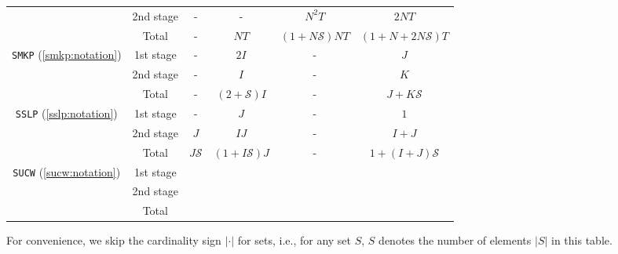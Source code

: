 \begin{table}[H]
{\begin{threeparttable}
\begin{tabular}{@{}cccccc@{}}
				& 2nd stage & -              & -                                  & $N^2 T$              & $2NT$                     \\ \cmidrule(l){2-6} 
				& Total          & -              & $NT$                               & $(1+N\mathcal{S})NT$ & $(1+N+2N\mathcal{S})T$    \\ \midrule
				\multirow{3}{*}{\texttt{SMKP} (\ref{smkp:notation})}   & 1st stage & -              & $2I$                               & -                    & $J$                       \\
				& 2nd stage & -              & $I$                                & -                    & $K$                       \\ \cmidrule(l){2-6} 
				& Total          & -              & $(2+\mathcal{S})I$                 & -                    & $J+K\mathcal{S}$          \\ \midrule
				\multirow{3}{*}{\texttt{SSLP} (\ref{sslp:notation})}   & 1st stage & -              & $J$                                & -                    & $1$                       \\
				& 2nd stage & $J$            & $IJ$                               & -                    & $I+J$                     \\ \cmidrule(l){2-6} 
				& Total          & $J\mathcal{S}$ & $(1+I\mathcal{S})J$                & -                    & $1+(I+J)\mathcal{S}$      \\ \midrule
				\multirow{3}{*}{\texttt{SUCW} (\ref{sucw:notation})}   & 1st stage &                &                                    &                      &                           \\
				& 2nd stage &                &                                    &                      &                           \\ \cmidrule(l){2-6} 
				& Total          &                &                                    &                      &                           \\ \bottomrule
			\end{tabular}
	
			\begin{tablenotes}
				\small
				\item For convenience, we skip the cardinality sign $|\cdot|$ for sets, i.e., for any set $S$, $S$ denotes the number of elements $|S|$ in this table.
			\end{tablenotes}
		\end{threeparttable}
	}
\end{table}
